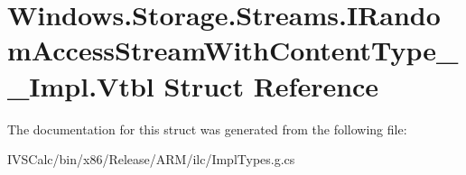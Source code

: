 \hypertarget{struct_windows_1_1_storage_1_1_streams_1_1_i_random_access_stream_with_content_type_____impl_1_1_vtbl}{}\section{Windows.\+Storage.\+Streams.\+I\+Random\+Access\+Stream\+With\+Content\+Type\+\_\+\+\_\+\+Impl.\+Vtbl Struct Reference}
\label{struct_windows_1_1_storage_1_1_streams_1_1_i_random_access_stream_with_content_type_____impl_1_1_vtbl}


The documentation for this struct was generated from the following file\+:\begin{DoxyCompactItemize}
\item 
I\+V\+S\+Calc/bin/x86/\+Release/\+A\+R\+M/ilc/Impl\+Types.\+g.\+cs\end{DoxyCompactItemize}
